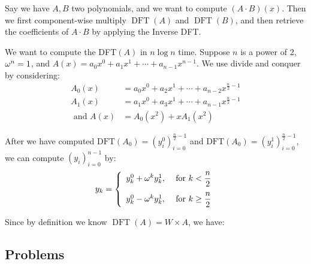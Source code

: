    \begin{algo} Say we have $A, B$ two
        polynomials, and we want to compute $(A\cdot B)(x)$. Then we first
        component-wise multiply $ \operatorname{DFT}(A) $ and $
        \operatorname{DFT}(B) $, and then retrieve the coefficients of $ A\cdot B
    $ by applying the Inverse DFT.  \end{algo}


    \begin{algo} We want to compute the DFT$ (A) $ in $
        n\log n $ time. Suppose $ n $ is a power of $ 2 $, $ \omega^n = 1 $, and $
        A(x) = a_{0} x^{0}+a_{1} x^{1}+\cdots+a_{n-1} x^{n-1} $. We use divide and
        conquer by considering: \begin{align*} A_{0}(x)&=a_{0} x^{0}+a_{2}
            x^{1}+\cdots+a_{n-2} x^{\frac{n}{2}-1} \\ A_{1}(x)&=a_{1} x^{0}+a_{3}
            x^{1}+\cdots+a_{n-1} x^{\frac{n}{2}-1}\\[.5em] \text{ and } A(x) &= A_0(x^2) +
        xA_1(x^2) \end{align*}

        After we have computed $ \text{DFT}(A_0) = (y^0_i)^{\frac{n}{2} - 1}_{i=0}
        $ and $ \text{DFT}(A_0) = (y^1_i)^{\frac{n}{2} - 1}_{i=0} $, we can
        compute $ (y_i)^{n-1}_{i=0} $ by: \[ y_k = \left\{ \begin{array}{ll} y^0_k
                + \omega^ky^1_k, &\text{ for } k < \dfrac{n}{2}\\[1em] y^0_k -
        \omega^ky^1_k, &\text{ for } k \ge \dfrac{n}{2} \end{array} \right.  \]
    \end{algo}

    \begin{algo} Since by definition we know $ \operatorname{DFT}(A)
    = W\times A $, we have: \end{algo}


    \newpage\subsection{Problems}




